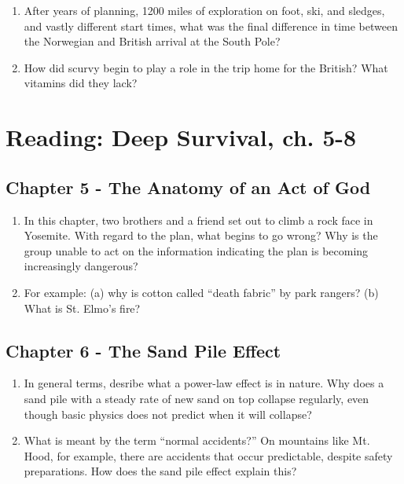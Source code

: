 \documentclass[10pt]{article}
\begin{document}
\begin{enumerate}
\item After years of planning, 1200 miles of exploration on foot, ski, and sledges, and vastly different start times, what was the final difference in time between the Norwegian and British arrival at the South Pole? \\ \vspace{1.5cm}
\item How did scurvy begin to play a role in the trip home for the British?  What vitamins did they lack? \\ \vspace{1.5cm}
\end{enumerate}

\section{Reading: Deep Survival, ch. 5-8}

\subsection{Chapter 5 - The Anatomy of an Act of God}

\begin{enumerate}
\item In this chapter, two brothers and a friend set out to climb a rock face in Yosemite.  With regard to the plan, what begins to go wrong?  Why is the group unable to act on the information indicating the plan is becoming increasingly dangerous? \\ \vspace{1.5cm}
\item For example: (a) why is cotton called ``death fabric'' by park rangers? (b) What is St. Elmo's fire? \\ \vspace{1.5cm}
\end{enumerate}

\subsection{Chapter 6 - The Sand Pile Effect}

\begin{enumerate}
\item In general terms, desribe what a power-law effect is in nature.  Why does a sand pile with a steady rate of new sand on top collapse regularly, even though basic physics does not predict when it will collapse? \\ \vspace{1.5cm}
\item What is meant by the term ``normal accidents?'' On mountains like Mt. Hood, for example, there are accidents that occur predictable, despite safety preparations.  How does the sand pile effect explain this? \\ \vspace{1.5cm}
\end{enumerate}
\end{document}
